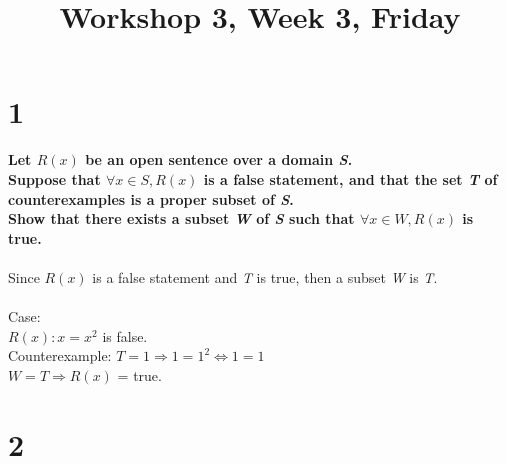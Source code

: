 \documentclass[danish,english,10pt,a4paper]{article}
\title{Workshop 3, Week 3, Friday}
\begin{document}
\maketitle

\section*{1}
\textbf{Let $R(x)$ be an open sentence over a domain \textit{S}.
\\
Suppose that $\forall x \in S, R(x)$ is a false statement, and that the set \textit{T} of counterexamples is a proper subset of \textit{S}.
\\
Show that there exists a subset \textit{W} of \textit{S} such that $\forall x \in W, R(x)$ is true.
}
\\
\\
Since $R(x)$ is a false statement and \textit{T} is true, then a subset \textit{W} is \textit{T}.
\\
\\
Case:
\\
$R(x): x = x^2$ is false.\\
Counterexample: $T = 1 \Rightarrow 1 = 1^2 \Leftrightarrow 1 = 1$
\\
$W = T \Rightarrow R(x)$ = true.


\section*{2}
\end{document}
